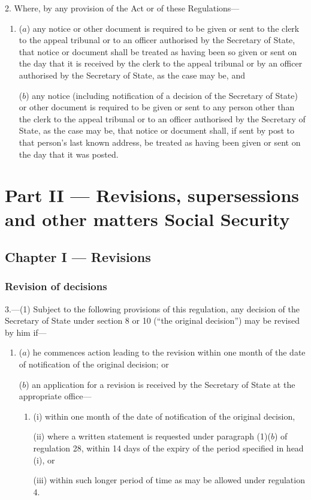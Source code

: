 \documentclass[12pt,a4paper]{article}
\begin{document}
2.  Where, by any provision of the Act or of these Regulations—
\begin{enumerate}\item[]
($a$) any notice or other document is required to be given or sent to the clerk to the appeal tribunal or to an officer authorised by the Secretary of State, that notice or document shall be treated as having been so given or sent on the day that it is received by the clerk to the appeal tribunal or by an officer authorised by the Secretary of State, as the case may be, and

($b$) any notice (including notification of a decision of the Secretary of State) or other document is required to be given or sent to any person other than the clerk to the appeal tribunal or to an officer authorised by the Secretary of State, as the case may be, that notice or document shall, if sent by post to that person’s last known address, be treated as having been given or sent on the day that it was posted.
\end{enumerate}

\section[Part II --- Revisions, supersessions and other matters Social Security]{Part II --- Revisions, supersessions and other matters Social Security}

\subsection[Chapter I --- Revisions]{Chapter I --- Revisions}

\subsubsection[3. Revision of decisions]{Revision of decisions}

\renewcommand\parthead{--- Part II Chapter I}

3.—(1) Subject to the following provisions of this regulation, any decision of the Secretary of State under section 8 or 10 (“the original decision”) may be revised by him if—
\begin{enumerate}\item[]
($a$) he commences action leading to the revision within one month of the date of notification of the original decision; or

($b$) an application for a revision is received by the Secretary of State at the appropriate office—
\begin{enumerate}\item[]
(i) within one month of the date of notification of the original decision,

(ii) where a written statement is requested under paragraph (1)($b$) of regulation 28, within 14 days of the expiry of the period specified in head (i), or

(iii) within such longer period of time as may be allowed under regulation 4.
\end{enumerate}
\end{enumerate}
\end{document}
